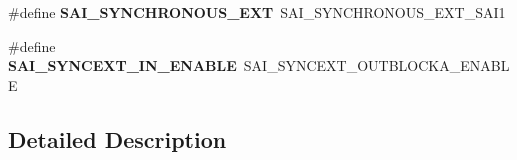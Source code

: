 \begin{DoxyCompactItemize}
\item 
\hypertarget{group___h_a_l___s_a_i___aliased___macros_ga14be5593f2f4de9699b49f5e307e98fe}{\#define {\bfseries S\-A\-I\-\_\-\-S\-Y\-N\-C\-H\-R\-O\-N\-O\-U\-S\-\_\-\-E\-X\-T}~S\-A\-I\-\_\-\-S\-Y\-N\-C\-H\-R\-O\-N\-O\-U\-S\-\_\-\-E\-X\-T\-\_\-\-S\-A\-I1}\label{group___h_a_l___s_a_i___aliased___macros_ga14be5593f2f4de9699b49f5e307e98fe}

\item 
\hypertarget{group___h_a_l___s_a_i___aliased___macros_ga05572ce0b163fe7bd2269692929f84af}{\#define {\bfseries S\-A\-I\-\_\-\-S\-Y\-N\-C\-E\-X\-T\-\_\-\-I\-N\-\_\-\-E\-N\-A\-B\-L\-E}~S\-A\-I\-\_\-\-S\-Y\-N\-C\-E\-X\-T\-\_\-\-O\-U\-T\-B\-L\-O\-C\-K\-A\-\_\-\-E\-N\-A\-B\-L\-E}\label{group___h_a_l___s_a_i___aliased___macros_ga05572ce0b163fe7bd2269692929f84af}

\end{DoxyCompactItemize}


\subsection{Detailed Description}
